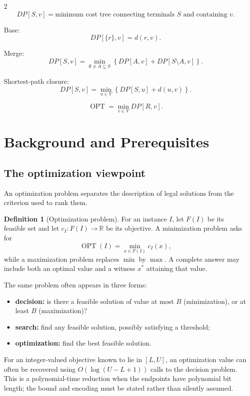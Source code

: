 \documentclass[8pt]{extarticle}
\theoremstyle{definition}
\newtheorem{definition}{Definition}[section]
\newcommand{\OPT}{\operatorname{OPT}}
\begin{document}
\begin{multicols*}{2}
\[
DP[S,v]
=
\text{minimum cost tree connecting terminals }S
\text{ and containing }v.
\]

Base:
\[
DP[\{r\},v]=d(r,v).
\]

Merge:
\[
DP[S,v]
=
\min_{\emptyset\ne A\subsetneq S}
\left\{
DP[A,v]+DP[S\setminus A,v]
\right\}.
\]

Shortest-path closure:
\[
DP[S,v]
=
\min_{u\in V}
\left\{
DP[S,u]+d(u,v)
\right\}.
\]

\[
\OPT=\min_{v\in V}DP[R,v].
\]

\begin{algorithm}[H]
\DontPrintSemicolon
{}
\;
\end{algorithm}
\section{Background and Prerequisites}\label{app:background}

\subsection{The optimization viewpoint}

An optimization problem separates the description of legal solutions from the
criterion used to rank them.

\begin{definition}[Optimization problem]
For an instance $I$, let $F(I)$ be its feasible set and let
$c_I\colon F(I)\to\mathbb{R}$ be its objective.  A minimization problem asks
for
\[
  \OPT(I)=\min_{x\in F(I)}c_I(x),
\]
while a maximization problem replaces $\min$ by $\max$.  A complete answer may
include both an optimal value and a witness $x^*$ attaining that value.
\end{definition}

The same problem often appears in three forms:
\begin{itemize}
  \item \textbf{decision:} is there a feasible solution of value at most $B$
        (minimization), or at least $B$ (maximization)?
  \item \textbf{search:} find any feasible solution, possibly satisfying a
        threshold;
  \item \textbf{optimization:} find the best feasible solution.
\end{itemize}
For an integer-valued objective known to lie in $[L,U]$, an optimization value
can often be recovered using $O(\log(U-L+1))$ calls to the decision problem.
This is a polynomial-time reduction when the endpoints have polynomial bit
length; the bound and encoding must be stated rather than silently assumed.


\end{multicols*}
\end{document}

